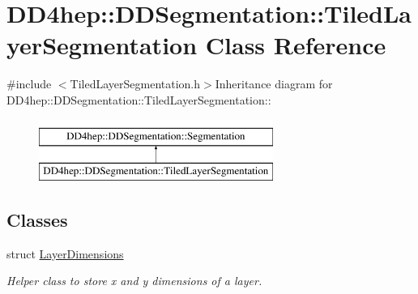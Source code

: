 \hypertarget{class_d_d4hep_1_1_d_d_segmentation_1_1_tiled_layer_segmentation}{
\section{DD4hep::DDSegmentation::TiledLayerSegmentation Class Reference}
\label{class_d_d4hep_1_1_d_d_segmentation_1_1_tiled_layer_segmentation}
}


{\ttfamily \#include $<$TiledLayerSegmentation.h$>$}Inheritance diagram for DD4hep::DDSegmentation::TiledLayerSegmentation::\begin{figure}[H]
\begin{center}
\leavevmode
\includegraphics[height=2cm]{class_d_d4hep_1_1_d_d_segmentation_1_1_tiled_layer_segmentation}
\end{center}
\end{figure}
\subsection*{Classes}
\begin{DoxyCompactItemize}
\item 
struct \hyperlink{struct_d_d4hep_1_1_d_d_segmentation_1_1_tiled_layer_segmentation_1_1_layer_dimensions}{LayerDimensions}
\begin{DoxyCompactList}\small\item\em Helper class to store x and y dimensions of a layer. \item\end{DoxyCompactList}\end{DoxyCompactItemize}
